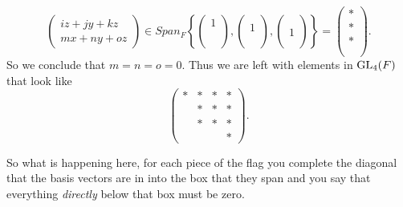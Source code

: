 \begin{example}
\[\begin{pmatrix}
            iz+jy+kz\\
            mx+ny+oz
        \end{pmatrix} \in Span_F\left\{\begin{pmatrix}
            1 \\
            \\
            \\
            \\
        \end{pmatrix}, \begin{pmatrix}
             \\
            1\\
            \\
            \\
        \end{pmatrix}, \begin{pmatrix}
             \\
            \\
            1\\
            \\
        \end{pmatrix}\right\} =\begin{pmatrix}
            *\\
            *\\
            *\\
            \\
        \end{pmatrix}. \]
        So we conclude that \(m = n = o = 0\). Thus we are left with elements in \(\operatorname{GL}_4(F)\) that look like
        \[\begin{pmatrix}
            * & *&*&*\\
            & *&*&*\\
            &*&*&*\\
            &&&*
        \end{pmatrix}.\]

    \end{example}


    So what is happening here, for each piece of the flag you complete the diagonal that the basis vectors are in into the box that they span and you say that everything \textit{directly} below that box must be zero.
    \vspace*{5mm}



